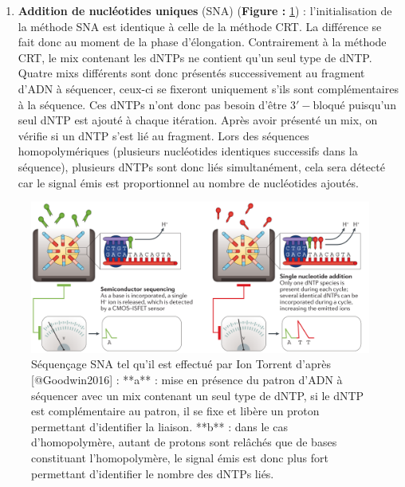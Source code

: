 \documentclass[12pt,twoside]{reedthesis}
\providecommand{\tightlist}{%
  \setlength{\itemsep}{0pt}\setlength{\parskip}{0pt}}
\theoremstyle{definition}
\theoremstyle{definition}
\theoremstyle{remark}
\begin{document}
  \newpage
  
  \begin{enumerate}
  \def\labelenumi{\alph{enumi}.}
  \setcounter{enumi}{1}
  \tightlist
  \item
    \textbf{Addition de nucléotides uniques} (SNA) (\textbf{Figure :
    }\ref{fig:snaSeq}) : l'initialisation de la méthode SNA est identique
    à celle de la méthode CRT. La différence se fait donc au moment de la
    phase d'élongation. Contrairement à la méthode CRT, le mix contenant
    les dNTPs ne contient qu'un seul type de dNTP. Quatre mixs différents
    sont donc présentés successivement au fragment d'ADN à séquencer,
    ceux-ci se fixeront uniquement s'ils sont complémentaires à la
    séquence. Ces dNTPs n'ont donc pas besoin d'être
    \(\mathrm{3'-bloqué}\) puisqu'un seul dNTP est ajouté à chaque
    itération. Après avoir présenté un mix, on vérifie si un dNTP s'est
    lié au fragment. Lors des séquences homopolymériques (plusieurs
    nucléotides identiques successifs dans la séquence), plusieurs dNTPs
    sont donc liés simultanément, cela sera détecté car le signal émis est
    proportionnel au nombre de nucléotides ajoutés.
  \end{enumerate}
  
  \begin{figure}
  
  {\centering \includegraphics[scale=.26]{figure/SNA_seq_ionTorrent} 
  
  }
  
  \caption[Séquençage SNA tel qu'il est effectué par Ion Torrent]{Séquençage SNA tel qu'il est effectué par Ion Torrent d'après [@Goodwin2016] : **a** : mise en présence du patron d'ADN à séquencer avec un mix contenant un seul type de dNTP, si le dNTP est complémentaire au patron, il se fixe et libère un proton permettant d'identifier la liaison. **b** : dans le cas d'homopolymère, autant de protons sont relâchés que de bases constituant l'homopolymère, le signal émis est donc plus fort permettant d'identifier le nombre des dNTPs liés.}\label{fig:snaSeq}
  \end{figure}
  
\end{document}
